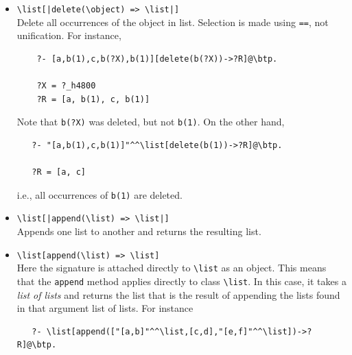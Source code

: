 \documentclass[11pt]{article}
\newcommand{\bs}{\textbackslash}
\begin{document}
\begin{itemize}
\begin{verbatim}
   ?X = 1
   ?R = [a, c, b(2)]

   ?X = 2
   ?R = [a, b(1), c]
\end{verbatim}
\item {\tt \bs{}list[|delete(\bs{}object) => \bs{}list|]}  \\
  Delete all occurrences of the object in list. Selection is made using
  \texttt{==}, not unification. For instance,
\begin{verbatim}
    ?- [a,b(1),c,b(?X),b(1)][delete(b(?X))->?R]@\btp.

    ?X = ?_h4800
    ?R = [a, b(1), c, b(1)]
\end{verbatim}
  Note that \texttt{b(?X)} was deleted, but not \texttt{b(1)}. On the other hand,
\begin{verbatim}
   ?- "[a,b(1),c,b(1)]"^^\list[delete(b(1))->?R]@\btp. 

   ?R = [a, c]
\end{verbatim}
  i.e., all occurrences of \texttt{b(1)} are deleted.
\item {\tt \bs{}list[|append(\bs{}list) => \bs{}list|]}  \\
  Appends one list to another and returns the resulting list.
\item \texttt{\bs{}list[append(\bs{}list) => \bs{}list]} \\
  Here the signature is attached directly to \texttt{\bs{}list} as an
  object. This means that the \texttt{append} method applies directly to
  class \texttt{\bs{}list}. In this case, it takes a \emph{list of lists}
  and returns the list that is the result of appending the lists found in
  that argument list of lists. For instance
\begin{verbatim}
   ?- \list[append(["[a,b]"^^\list,[c,d],"[e,f]"^^\list])->?R]@\btp.  


\end{verbatim}
\end{itemize}
\end{document}
